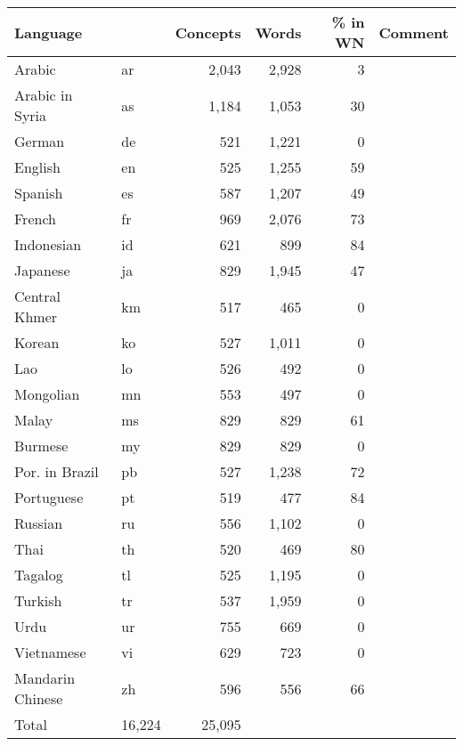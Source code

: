 \begin{tabular}{llrrrl} 
Language& & Concepts	& Words & \% in WN & Comment \\
\hline 
Arabic & ar	& 2,043	& 2,928 & 3\\
Arabic in Syria & as	& 1,184	& 1,053 & 30\\
German & de	&   521	& 1,221 & 0\\
English & en	&   525	& 1,255 & 59\\
Spanish & es	&   587	& 1,207 & 49\\
French & fr	&   969	& 2,076 & 73\\
Indonesian & id	&   621	&   899 & 84\\
Japanese & ja	&   829	& 1,945 & 47\\
Central Khmer & km	&   517	&   465 & 0\\
Korean & ko	&   527	& 1,011 & 0\\
Lao & lo	&   526	&   492 & 0\\
Mongolian & mn	&   553	&   497 & 0\\
Malay & ms	&   829	&   829 & 61\\
Burmese & my	&   829	&   829 & 0\\
Por. in Brazil & pb	&   527	& 1,238 & 72\\
Portuguese & pt	&   519	&   477 & 84\\
Russian & ru	&   556	& 1,102 & 0\\
Thai & th	&   520	&   469 & 80\\
Tagalog & tl	&   525	& 1,195 & 0\\
Turkish & tr	&   537	& 1,959 & 0\\
Urdu & ur	&   755	&   669 & 0\\
Vietnamese & vi	&   629	&   723 & 0\\
Mandarin Chinese & zh	&   596	&   556 & 66\\
Total	&16,224	&25,095 \\
\end{tabular}
